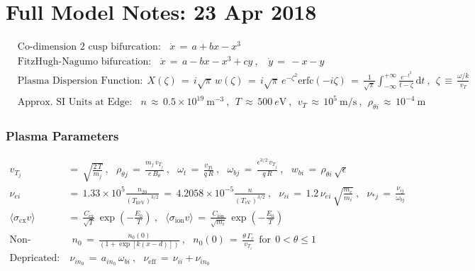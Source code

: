 \documentclass[a4paper,8pt]{article}
\date{}
\begin{document}
\section{Full Model Notes: 23 Apr
2018}\label{full-model-notes-23-apr-2018}

\small

\begin{align}
    &\text{Co-dimension 2 cusp bifurcation:} ~~~~ \dot{x} \,=\, a + bx - x^3 \\
    &\text{FitzHugh-Nagumo bifurcation:} ~~~~ \dot{x} \,=\, a - bx - x^3 + cy~,
        ~~~~ \dot{y} \,=\, -x - y \\
    &\text{Plasma Dispersion Function:} ~~ X(\zeta) \,=\, i \sqrt{\pi}\,w(\zeta)
        \,=\, i \sqrt{\pi} \, e^{-\zeta^2} \text{erfc}(-i \zeta)
        \,=\, \frac{1}{\sqrt{\pi}} \int_{-\infty}^{+\infty}
        \frac{e^{-t^2}}{t - \zeta} \, \text{d}t~,~~
        \zeta \,\equiv\, \frac{\omega/k}{v_T} \\
    &\text{Approx. SI Units at Edge:} ~~~~ n \,\approx\, 0.5\times 10^{19}~\text{m}^{-3}~,
        ~~ T \,\approx\, 500~e\text{V}~,~~ v_T \,\approx\, 10^5~\text{m}/\text{s}~,
        ~~ \rho_{\theta i} \,\approx\, 10^{-4}~\text{m}
\end{align}

\normalsize

\subsubsection{Plasma Parameters}\label{plasma-parameters}

\small

\begin{align}
    v_{T_j} \,&=\, \sqrt{\frac{2 \, T}{m_j}}~,~~~
        \rho_{\theta j} \,=\, \frac{m_j \, v_{T_j}}{e \, B_\theta}~,~~~
        \omega_t \,=\, \frac{v_{Ti}}{q\,R}~,~~~
        \omega_{bj} \,=\, \frac{\epsilon^{3/2} \, v_{T_j}}{q \, R}~,~~~
        w_{bi} \,=\, \rho_{\theta i} \, \sqrt{\epsilon} \\
    \nu_{ei} \,&=\, 1.33\times 10^5 \frac{n_{20}}{(T_\text{keV})^{3/2}}
        \,=\, 4.2058\times 10^{-5} \frac{n}{(T_\text{eV})^{3/2}}~,~~~
        \nu_{ii} \,=\, 1.2\, \nu_{ei} \, \sqrt{\frac{m_e}{m_i}}~,~~~
        \nu_{*j} \,=\, \frac{\nu_{ij}}{\omega_{bj}} \\
    \langle \sigma_\text{cx} v \rangle \,&=\, \frac{C_\text{cx}}{\sqrt{T}} \,
        \exp\left(-\frac{E_0}{T}\right)~,~~~
        \langle \sigma_\text{ion} v \rangle \,=\, \frac{C_\text{ion}}{\sqrt{m_i}} \,
        \exp\left(-\frac{E_0}{T}\right) \\
    \text{Non-formal:}& ~~ n_0 \,=\, \frac{n_0(0)}
        {\left(1 + \exp\left[k(x - d)\right]\right)}~,~~~
        n_0(0) \,=\, \frac{\theta \, \Gamma_c}{v_{T_i}} ~~ \text{for} ~~
        0 < \theta \leq 1 \\
    \text{Depricated:}&~\nu_{in_0} \,=\, a_{in_0} \, \omega_{bi}~,~~~
        \nu_\text{eff} \,=\, \nu_{ii} + \nu_{in_0}
\end{align}
\end{document}
